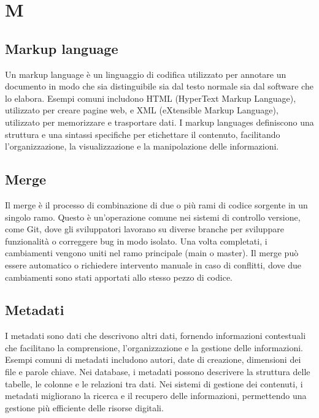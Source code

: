 \section{M}
\vspace{2em}
\subsection*{Markup language}
Un markup language è un linguaggio di codifica utilizzato per annotare un documento in modo che sia distinguibile sia dal testo normale sia dal software che lo elabora. Esempi comuni includono HTML (HyperText Markup Language), utilizzato per creare pagine web, e XML (eXtensible Markup Language), utilizzato per memorizzare e trasportare dati. I markup languages definiscono una struttura e una sintassi specifiche per etichettare il contenuto, facilitando l'organizzazione, la visualizzazione e la manipolazione delle informazioni.

\vspace{2em}
\subsection*{Merge}
Il merge è il processo di combinazione di due o più rami di codice sorgente in un singolo ramo. Questo è un'operazione comune nei sistemi di controllo versione, come Git, dove gli sviluppatori lavorano su diverse branche per sviluppare funzionalità o correggere bug in modo isolato. Una volta completati, i cambiamenti vengono uniti nel ramo principale (main o master). Il merge può essere automatico o richiedere intervento manuale in caso di conflitti, dove due cambiamenti sono stati apportati allo stesso pezzo di codice.

\vspace{2em}
\subsection*{Metadati}
I metadati sono dati che descrivono altri dati, fornendo informazioni contestuali che facilitano la comprensione, l'organizzazione e la gestione delle informazioni. Esempi comuni di metadati includono autori, date di creazione, dimensioni dei file e parole chiave. Nei database, i metadati possono descrivere la struttura delle tabelle, le colonne e le relazioni tra dati. Nei sistemi di gestione dei contenuti, i metadati migliorano la ricerca e il recupero delle informazioni, permettendo una gestione più efficiente delle risorse digitali.


